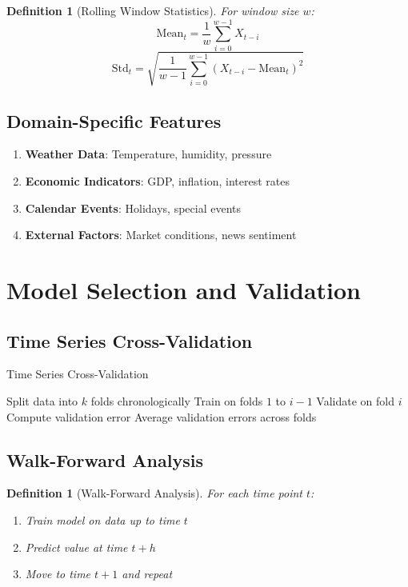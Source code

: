 \documentclass[11pt,a4paper]{article}
\newtheorem{definition}[theorem]{Definition}
\begin{document}
\begin{definition}[Rolling Window Statistics]
For window size $w$:
$$\text{Mean}_t = \frac{1}{w}\sum_{i=0}^{w-1} X_{t-i}$$
$$\text{Std}_t = \sqrt{\frac{1}{w-1}\sum_{i=0}^{w-1} (X_{t-i} - \text{Mean}_t)^2}$$
\end{definition}

\subsection{Domain-Specific Features}

\begin{enumerate}
\item \textbf{Weather Data}: Temperature, humidity, pressure
\item \textbf{Economic Indicators}: GDP, inflation, interest rates
\item \textbf{Calendar Events}: Holidays, special events
\item \textbf{External Factors}: Market conditions, news sentiment
\end{enumerate}

\section{Model Selection and Validation}

\subsection{Time Series Cross-Validation}

\begin{algorithm}
\caption{Time Series Cross-Validation}
\begin{algorithmic}[1]
\STATE Split data into $k$ folds chronologically
    \STATE Train on folds $1$ to $i-1$
    \STATE Validate on fold $i$
    \STATE Compute validation error
\ENDFOR
\STATE Average validation errors across folds
\end{algorithmic}
\end{algorithm}

\subsection{Walk-Forward Analysis}

\begin{definition}[Walk-Forward Analysis]
For each time point $t$:
\begin{enumerate}
\item Train model on data up to time $t$
\item Predict value at time $t+h$
\item Move to time $t+1$ and repeat
\end{enumerate}
\end{definition}
\end{document}
